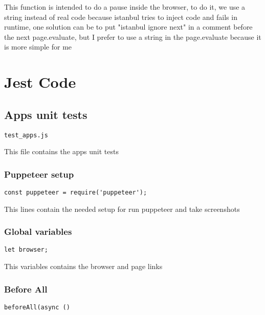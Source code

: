 \documentclass[a4paper]{article}
\begin{document}
This function is intended to do a pause inside the browser, to do it, we
use a string instead of real code because istanbul tries to inject code
and fails in runtime, one solution can be to put "istanbul ignore next"
in a comment before the next page.evaluate, but I prefer to use a string
in the page.evaluate because it is more simple for me


\hypertarget{toc17}{}
\section{Jest Code}

\hypertarget{toc18}{}
\subsection{Apps unit tests}

\begin{lstlisting}
test_apps.js
\end{lstlisting}

This file contains the apps unit tests

\hypertarget{toc19}{}
\subsubsection{Puppeteer setup}

\begin{lstlisting}
const puppeteer = require('puppeteer');
\end{lstlisting}

This lines contain the needed setup for run puppeteer and take screenshots

\hypertarget{toc20}{}
\subsubsection{Global variables}

\begin{lstlisting}
let browser;
\end{lstlisting}

This variables contains the browser and page links

\hypertarget{toc21}{}
\subsubsection{Before All}

\begin{lstlisting}
beforeAll(async ()
\end{lstlisting}
\end{document}
